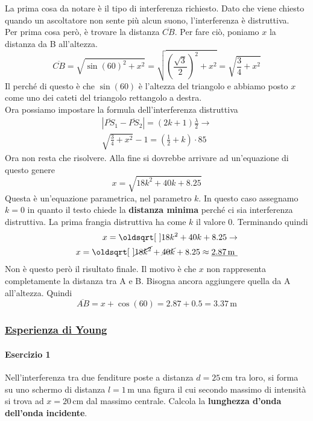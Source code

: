 La prima cosa da notare è il tipo di interferenza richiesto. Dato che viene chiesto quando un 
ascoltatore non sente più alcun suono, l'interferenza è distruttiva.\\
Per prima cosa però, è trovare la distanza $\overline{CB}$. Per fare ciò, poniamo $x$ la distanza
da B all'altezza.
\begin{equation*}
\overline{CB} = \sqrt{\sin(60)^2 + x^2} = \sqrt{\left(\frac{\sqrt{3}}{2}\right)^2 +
x^2} = \sqrt{\frac{3}{4} + x^2}
\end{equation*}
Il perché di questo è che $\sin(60)$ è l'altezza del triangolo e abbiamo posto $x$ come uno dei
cateti del triangolo rettangolo a destra.\\
Ora possiamo impostare la formula dell'interferenza distruttiva
\begin{align*}
\left\lvert \overline{PS}_1-\overline{PS}_2 \right\rvert = 
(2k + 1)\frac{\lambda}{2} \rightarrow \\
\sqrt{\frac{3}{4} + x^2} - 1 = \left(\frac{1}{2}+k\right)\cdot85
\end{align*}
Ora non resta che risolvere. Alla fine si dovrebbe arrivare ad un'equazione di questo genere
\begin{equation*}
x = \sqrt{18k^2 + 40k + 8.25}
\end{equation*}
Questa è un'equazione parametrica, nel parametro $k$. In questo caso assegnamo $k = 0$ in quanto il
testo chiede la \textbf{distanza minima} perché ci sia interferenza distruttiva. La prima frangia
distruttiva ha come $k$ il valore $0$. Terminando quindi
\begin{align*}
x = \sqrt{18k^2 + 40k + 8.25} \rightarrow \\
x = \sqrt{\cancel{18k^2} + \cancel{40k} + 8.25} \approx
\underline{2.87\,\text{m	}}
\end{align*}
Non è questo però il risultato finale. Il motivo è che $x$ non rappresenta completamente la
distanza tra A e B. Bisogna ancora aggiungere quella da A all'altezza. Quindi
\begin{equation*}
\overline{AB} = x + \cos(60) = 2.87 + 0.5 = \boxed{3.37\,\text{m}}
\end{equation*}

\subsubsection*{\hyperref[subsec:onde:young]{Esperienza di Young}}\label{ex:young}
\paragraph{Esercizio 1}
Nell'interferenza tra due fenditure poste a distanza $d = 25\,\text{cm}$ tra loro, si forma su uno 
schermo di distanza $l = 1\,\text{m}$ una figura il cui secondo massimo di intensità si trova ad $x = 
20\,\text{cm}$ dal massimo centrale. Calcola la \textbf{lunghezza d'onda dell'onda incidente}.
\divisor

